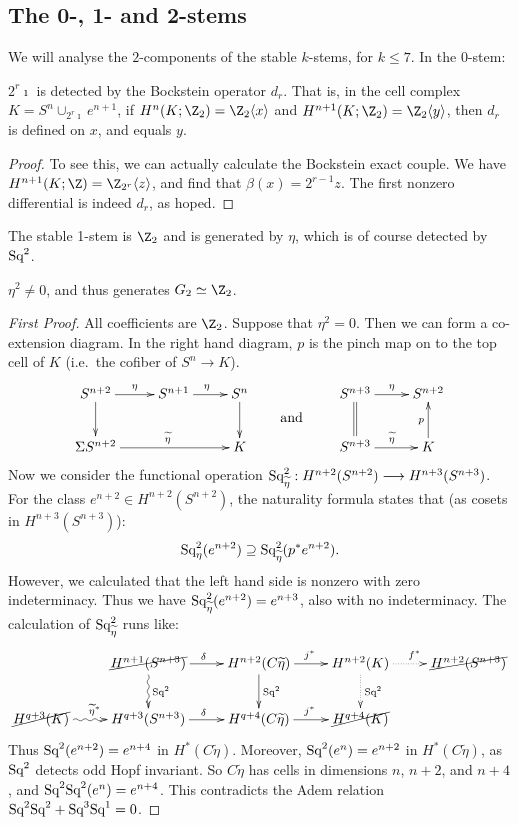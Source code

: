 \documentclass[11pt]{article}
\begin{document}
\subsection{The 0-, 1- and 2-stems}
We will analyse the $2$-components of the stable $k$-stems, for $k\leq7$. In the
$0$-stem:
\begin{prop*}[1]
$2^r\imath$ is detected by the Bockstein operator $d_r$. That is, in the cell
complex $K=S^n\cup_{2^r\imath}e^{n+1}$, if $H^{n}(K;\Z_2)=\Z_2\langle x\rangle$
and $H^{n+1}(K;\Z_2)=\Z_2\langle y\rangle$, then $d_r$ is defined on $x$, and
equals $y$.
\end{prop*}
\begin{proof}
To see this, we can actually calculate the Bockstein exact couple. We have
$H^{n+1}(K;\Z)=\Z_{2^r}\langle z\rangle$, and find that $\beta(x)=2^{r-1}z$. The
first nonzero differential is indeed $d_r$, as hoped.
\end{proof}
The stable 1-stem is $\Z_2$ and is generated by $\eta$, which is of course
detected by $\textup{Sq}^2$.
\begin{prop*}[2]
$\eta^2\neq0$, and thus generates $G_2\simeq\Z_2$.
\end{prop*}
\begin{proof}[First Proof]
All coefficients are $\Z_2$. Suppose that $\eta^2=0$. Then we can form a
co-extension diagram. In the right hand diagram, $p$ is the pinch map on to the
top cell of $K$ (i.e.\ the cofiber of $S^n\to K$).
\[\xymatrix{
S^{n+2}\ar[d]\ar[r]^\eta&S^{n+1}\ar[r]^\eta&S^n\ar[d]\\
\Sigma S^{n+2}\ar[rr]^{\widetilde \eta}&&K
}
\raisebox{-.6cm}{\text{\qquad and \qquad}}
\xymatrix{
S^{n+3}\ar[r]^\eta&S^{n+2}\\
S^{n+3}\ar[r]^{\widetilde\eta}\ar@{=}[u]&K\ar[u]^p
}\]
Now we consider the functional operation 
$\textup{Sq}^2_{\widetilde\eta}:H^{n+2}(S^{n+2})\longrightarrow H^{n+3}(S^{n+3})$.
For the class $e^{n+2}\in H^{n+2}(S^{n+2})$, the naturality formula states
that (as cosets in $H^{n+3}(S^{n+3})$):
\[\textup{Sq}^2_\eta(e^{n+2})\supseteq\textup{Sq}^2_{\widetilde\eta}(p^*e^{n+2}).\]
However, we calculated that the left hand side is nonzero with zero 
indeterminacy. Thus we have $\textup{Sq}^2_{\widetilde\eta}(e^{n+2})=e^{n+3}$, also 
with no indeterminacy. The calculation of $\textup{Sq}^2_{\widetilde\eta}$ runs like:
\[\xymatrix{
&\cancel{H^{n+1}(S^{n+3})}\ar[r]^\delta\ar@{~>}[d]^{\Squ^2}&
H^{n+2}(C\widetilde\eta)\ar[r]^{j^*}\ar[d]^{\Squ^2}&
H^{n+2}(K)\ar@{.>}[r]^{f^*}\ar@{.>}[d]^{\Squ^2}&
\cancel{H^{n+2}(S^{n+3})}\\
\cancel{H^{q+3}(K)}\ar@{~>}[r]^{\widetilde\eta^*}&
H^{q+3}(S^{n+3})\ar[r]^\delta&
H^{q+4}(C\widetilde\eta)\ar[r]^{j^*}&
\cancel{H^{q+4}(K)}
}\]
Thus $\textup{Sq}^2(e^{n+2})=e^{n+4}$ in $H^*(C\widetilde\eta)$. Moreover,
$\textup{Sq}^2(e^{n})=e^{n+2}$ in $H^*(C\widetilde\eta)$, as $\textup{Sq}^2$ detects odd Hopf
invariant. So $C\widetilde\eta$ has cells in dimensions $n$, $n+2$, and $n+4$,
and $\textup{Sq}^2\textup{Sq}^2(e^n)=e^{n+4}$. This contradicts the Adem relation
$\textup{Sq}^2\textup{Sq}^2+\textup{Sq}^3\textup{Sq}^1=0$.
\end{proof}
\end{document}
